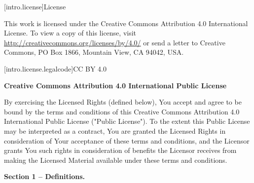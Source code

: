 
[intro.license]{License}

%

This work is licensed under the Creative Commons Attribution 4.0 International
License. To view a copy of this license, visit
\url{http://creativecommons.org/licenses/by/4.0/} or send a letter to Creative
Commons, PO Box 1866, Mountain View, CA 94042, USA.


[intro.license.legalcode]{CC BY 4.0}

\begin{center}
\textbf{Creative Commons Attribution 4.0 International Public License}
\end{center}

By exercising the Licensed Rights (defined below), You accept and agree
to be bound by the terms and conditions of this Creative Commons
Attribution 4.0 International Public License ("Public License"). To the
extent this Public License may be interpreted as a contract, You are
granted the Licensed Rights in consideration of Your acceptance of
these terms and conditions, and the Licensor grants You such rights in
consideration of benefits the Licensor receives from making the
Licensed Material available under these terms and conditions.


\textbf{Section 1 -- Definitions.}


